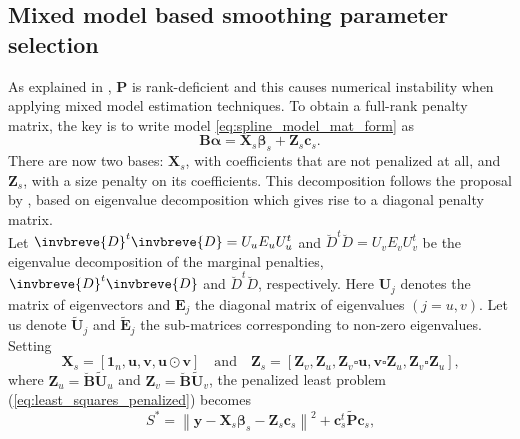 \subsection{Mixed model based smoothing parameter selection}

As explained in \textcite{rodriguez2016spatial}, $\mathbf{P}$ is rank-deficient and this causes numerical instability when applying mixed model estimation techniques. To obtain a full-rank penalty matrix, the key is to write model \ref{eq:spline_model_mat_form} as 
\begin{equation}
    \mathbf{B}\boldsymbol{\alpha} = \boldsymbol{X}_{s} \boldsymbol{\beta}_{s}+\boldsymbol{Z}_{s} \boldsymbol{c}_{s}
    \text{.}
\end{equation}
There are now two bases: $\mathbf{X}_{s}$, with coefficients that are not penalized at all, and $\mathbf{Z}_{s}$, with a size penalty on its coefficients. This decomposition follows the proposal by \textcite{lee_p-spline_2011}, based on eigenvalue decomposition which gives rise to a diagonal penalty matrix.\\
Let $\invbreve{D}^{t} \invbreve{D}=U_{u} E_{u} U_{u}^{t}$ and $\breve{D}^{t} \breve{D}=U_{v} E_{v} U_{v}^{t}$ be the eigenvalue decomposition of the marginal penalties, $\invbreve{D}^{t} \invbreve{D}$ and $\breve{D}^{t} \breve{D}$, respectively. Here $\mathbf{U}_{j}$ denotes the matrix of eigenvectors and $\mathbf{E}_j$  the diagonal matrix of eigenvalues $(j=u,v)$. Let us denote $\widetilde{\boldsymbol{U}}_{j}$ and $\widetilde{\boldsymbol{E}}_{j}$ the sub-matrices corresponding to non-zero eigenvalues. Setting
\begin{equation}
    \boldsymbol{X}_{s}=\left[\mathbf{1}_{n}, \boldsymbol{u}, \boldsymbol{v}, \boldsymbol{u} \odot \boldsymbol{v}\right]
    \quad
    \text{and}
    \quad
    \mathbf{Z}_{s}=\left[\mathbf{Z}_{v}, \mathbf{Z}_{u}, \mathbf{Z}_{v} \square \mathbf{u}, \mathbf{v} \square \mathbf{Z}_{u}, \mathbf{Z}_{v} \square \mathbf{Z}_{u}\right]
    \text{,}
    \label{eq:detail_Xs_Zs_matrices}
\end{equation}
where $\mathbf{Z}_u = \breve{\mathbf{B}}\widetilde{\boldsymbol{U}}_{u}$ and $\mathbf{Z}_v = \breve{\mathbf{B}}\widetilde{\boldsymbol{U}}_{v}$, the penalized least problem (\ref{eq:least_squares_penalized}) becomes
\begin{equation}
    S^{*}=\left\|\boldsymbol{y}-\boldsymbol{X}_{s} \boldsymbol{\beta}_{s}-\boldsymbol{Z}_{s} \boldsymbol{c}_{s}\right\|^{2}+\boldsymbol{c}_{s}^{t} \widetilde{\boldsymbol{P}} \boldsymbol{c}_{s}
    \text{,}
    \label{eq:new_least_squares_penalized}
\end{equation}
